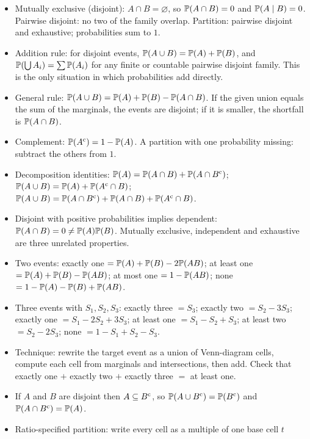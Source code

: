 \begin{itemize}[nosep]
\item Mutually exclusive (disjoint): $A \cap B = \varnothing$, so $\mathbb{P}(A \cap B) = 0$ and
      $\mathbb{P}(A \mid B) = 0$. Pairwise disjoint: no two of the family overlap. Partition:
      pairwise disjoint and exhaustive; probabilities sum to $1$.
\item Addition rule: for disjoint events, $\mathbb{P}(A \cup B) = \mathbb{P}(A) + \mathbb{P}(B)$, and
      $\mathbb{P}(\bigcup A_i) = \sum \mathbb{P}(A_i)$ for any finite or countable pairwise disjoint
      family. This is the only situation in which probabilities add directly.
\item General rule: $\mathbb{P}(A \cup B) = \mathbb{P}(A) + \mathbb{P}(B) - \mathbb{P}(A \cap B)$. If the given
      union equals the sum of the marginals, the events are disjoint; if it is smaller, the
      shortfall is $\mathbb{P}(A \cap B)$.
\item Complement: $\mathbb{P}(A^{\mathrm{c}}) = 1 - \mathbb{P}(A)$. A partition with one probability missing:
      subtract the others from $1$.
\item Decomposition identities: $\mathbb{P}(A) = \mathbb{P}(A \cap B) + \mathbb{P}(A \cap B^{\mathrm{c}})$;
      $\mathbb{P}(A \cup B) = \mathbb{P}(A) + \mathbb{P}(A^{\mathrm{c}} \cap B)$;
      $\mathbb{P}(A \cup B) = \mathbb{P}(A \cap B^{\mathrm{c}}) + \mathbb{P}(A \cap B) + \mathbb{P}(A^{\mathrm{c}} \cap B)$.
\item Disjoint with positive probabilities implies dependent: $\mathbb{P}(A \cap B) = 0 \neq
      \mathbb{P}(A)\mathbb{P}(B)$. Mutually exclusive, independent and exhaustive are three unrelated
      properties.
\item Two events: exactly one $= \mathbb{P}(A) + \mathbb{P}(B) - 2\mathbb{P}(AB)$; at least one
      $= \mathbb{P}(A) + \mathbb{P}(B) - \mathbb{P}(AB)$; at most one $= 1 - \mathbb{P}(AB)$; none
      $= 1 - \mathbb{P}(A) - \mathbb{P}(B) + \mathbb{P}(AB)$.
\item Three events with $S_1, S_2, S_3$: exactly three $= S_3$; exactly two $= S_2 - 3S_3$;
      exactly one $= S_1 - 2S_2 + 3S_3$; at least one $= S_1 - S_2 + S_3$; at least two
      $= S_2 - 2S_3$; none $= 1 - S_1 + S_2 - S_3$.
\item Technique: rewrite the target event as a union of Venn-diagram cells, compute each cell
      from marginals and intersections, then add. Check that exactly one $+$ exactly two $+$
      exactly three $=$ at least one.
\item If $A$ and $B$ are disjoint then $A \subseteq B^{\mathrm{c}}$, so $\mathbb{P}(A \cup B^{\mathrm{c}}) =
      \mathbb{P}(B^{\mathrm{c}})$ and $\mathbb{P}(A \cap B^{\mathrm{c}}) = \mathbb{P}(A)$.
\item Ratio-specified partition: write every cell as a multiple of one base cell $t$

\end{itemize}
